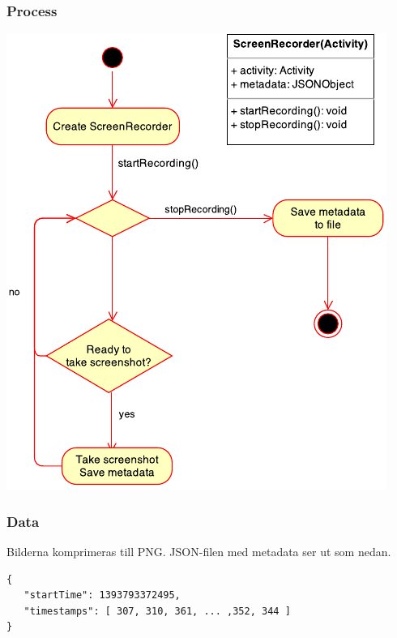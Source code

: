\subsubsection{Process}
\includegraphics[scale=1.0]{screenflow.pdf}
\subsubsection{Data}
Bilderna komprimeras till PNG. JSON-filen med metadata ser ut som nedan.
\begin{verbatim}
{
   "startTime": 1393793372495,
   "timestamps": [ 307, 310, 361, ... ,352, 344 ]
}
\end{verbatim}